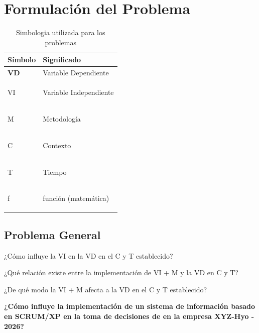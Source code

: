 \chapter{Formulación del Problema}

        \begin{table}[!ht]
            \small %
            \renewcommand{\arraystretch}{1} %
            
            \caption{Simbologia utilizada para los problemas }
            \label{tab:atributos-negativos-pantallas}

            \begin{tabularx}{\textwidth}{@{} >{\raggedright\arraybackslash\bfseries}p{2.0cm} X @{}}
                \toprule
                \textbf{Símbolo} & \textbf{Significado} \\ 
                \midrule
                VD & Variable Dependiente \\
                \addlinespace[0.3cm]
                
                VI & Variable Independiente \\
                \addlinespace[0.3cm]
                                
                M & Metodología \\
                \addlinespace[0.3cm]

                C & Contexto \\
                \addlinespace[0.3cm]
                
                T & Tiempo \\
                \addlinespace[0.3cm]

                f & función (matemática) \\
                \bottomrule
            \end{tabularx}
            
    \end{table}

\section{Problema General}
    \begin{sectext}
        ¿Cómo influye la VI en la VD en el C y T establecido?

        ¿Qué relación existe entre la implementación de VI + M y la VD en C y T?

        ¿De qué modo la VI + M afecta  a la VD en el C y T establecido?

        \textbf{¿Cómo influye la implementación de un sistema de información basado en SCRUM/XP en la toma de decisiones de en la empresa XYZ-Hyo - 2026?}
    \end{sectext}

